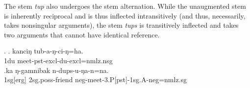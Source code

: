 \begin{table}[t]
\begin{center}
\caption{Stem augmentation and  correspondences}\label{stem-aug}
\end{center}
\end{table}

The stem \emph{tup}  also undergoes the stem alternation. While the unaugmented stem is inherently reciprocal and is thus inflected intransitively (and thus, necessarily, takes nonsingular arguments), the stem \emph{tups} is transitively  inflected and takes two arguments that cannot have identical reference.

	 \ex. \ag. kanciŋ tub-a-ŋ-ci-ŋ=ha.\\
 {\sc 1du} meet-{\sc pst-excl-du-excl=nmlz.nsg}\\
	 \bg.ka ŋ-gamnibak n-dups-u-ŋa-n=na.\\
	 {\sc 1sg[erg]} {\sc 2sg.poss-}friend  {\sc neg-}meet{\sc -3.P[pst]-1sg.A-neg=nmlz.sg}\\









